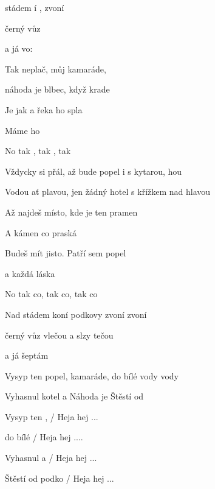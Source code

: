 

\zs
{} stádem í  , zvoní 

černý vůz   

a já vo:
\ks

\zs
Tak neplač, můj kamaráde,

náhoda je blbec, když krade

Je  jak  a řeka ho spla

Máme ho 

No tak ,
tak ,
tak 
\ks

\zs
Vždycky si přál, až bude popel i s kytarou, hou

Vodou ať plavou, jen žádný hotel s křížkem nad hlavou
\ks

\zs
Až najdeš místo, kde je ten pramen

A kámen co praská

Budeš mít jisto. Patří  sem popel

a každá láska

No tak co, tak co, tak co
\ks

\zs
Nad stádem koní podkovy zvoní zvoní

černý vůz vlečou a slzy tečou

a já šeptám
\ks

\zs
Vysyp ten popel, kamaráde, do bílé vody vody

Vyhasnul kotel a Náhoda je Štěstí od 
\ks

\zs
Vysyp ten ,    / Heja hej ...

do bílé    / Heja hej ....

Vyhasnul  a   / Heja hej ...

Štěstí od podko / Heja hej ...
\ks

\kp





